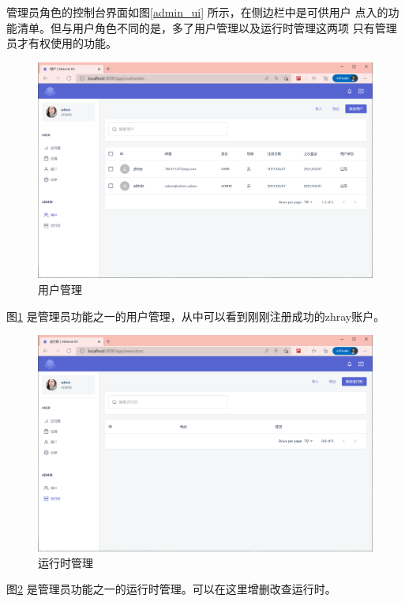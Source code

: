 管理员角色的控制台界面如图\ref{admin_ui} 所示，在侧边栏中是可供用户
点入的功能清单。但与用户角色不同的是，多了用户管理以及运行时管理这两项
只有管理员才有权使用的功能。

\begin{figure}[htbp!]
  \centering
  \includegraphics[width=\textwidth]{figures/png/admin_users.png}
  \caption{\label{admin_users}用户管理}
\end{figure}

图\ref{admin_users} 是管理员功能之一的用户管理，从中可以看到刚刚注册成功的zhray账户。

\begin{figure}[htbp!]
  \centering
  \includegraphics[width=\textwidth]{figures/png/exes.png}
  \caption{\label{exes}运行时管理}
\end{figure}

图\ref{exes} 是管理员功能之一的运行时管理。可以在这里增删改查运行时。

